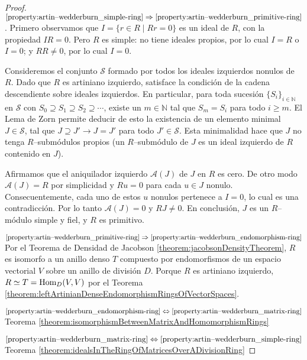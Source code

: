 \documentclass{report}
\newcommand{\naturalNumbers}{\mathbb{N}}
\newcommand{\Hom}{\textnormal{Hom}}
\begin{document}
  \begin{proof}
    \(\ref{property:artin--wedderburn_simple-ring} \Rightarrow \ref{property:artin--wedderburn_primitive-ring}\).
    Primero observamos que \(I = \{r \in R \mid R r = 0\}\) es un ideal de \(R\), con la propiedad \(I R = 0\).
    Pero \(R\) es simple: no tiene ideales propios, por lo cual \(I = R\) o \(I = 0\);
    y \(R R \neq 0\), por lo cual \(I = 0\).

    Consideremos el conjunto \(\mathcal{S}\) formado por todos los ideales izquierdos nonulos de \(R\).
    Dado que \(R\) es artiniano izquierdo, satisface la condición de la cadena descendiente sobre ideales izquierdos.
    En particular, para toda sucesión \(\{S_i\}_{i \in \naturalNumbers}\) en \(\mathcal{S}\) con \(S_0 \supseteq S_1 \supseteq S_2 \supseteq \cdots\), existe un \(m \in \naturalNumbers\) tal que \(S_m = S_i\) para todo \(i \geq m\).
    El Lema de Zorn permite deducir de esto la existencia de un elemento minimal \(J \in \mathcal{S}\), tal que \(J \supseteq J' \rightarrow J = J'\) para todo \(J' \in \mathcal{S}\).
    Esta minimalidad hace que \(J\) no tenga \(R\)--submódulos propios (un \(R\)--submódulo de \(J\) es un ideal izquierdo de \(R\) contenido en \(J\)).

    Afirmamos que el aniquilador izquierdo \(\mathcal{A}(J)\) de \(J\) en \(R\) es cero.
    De otro modo \(\mathcal{A}(J) = R\) por simplicidad y \(R u = 0\) para cada \(u \in J\) nonulo.
    Consecuentemente, cada uno de estos \(u\) nonulos pertenece a \(I = 0\), lo cual es una contradicción.
    Por lo tanto \(\mathcal{A}(J) = 0\) y \(R J \neq 0\).
    En conclusión, \(J\) es un \(R\)--módulo simple y fiel, y \(R\) es primitivo.

    \(\ref{property:artin--wedderburn_primitive-ring} \Rightarrow \ref{property:artin--wedderburn_endomorphism-ring}\)
    Por el Teorema de Densidad de Jacobson \ref{theorem:jacobsonDensityTheorem}, \(R\) es isomorfo a un anillo denso \(T\) compuesto por endomorfismos de un espacio vectorial \(V\) sobre un anillo de división \(D\).
    Porque \(R\) es artiniano izquierdo, \(R \simeq T = \Hom _D(V, V)\) por el Teorema \ref{theorem:leftArtinianDenseEndomorphismRingsOfVectorSpaces}.

    \(\ref{property:artin--wedderburn_endomorphism-ring} \Leftrightarrow \ref{property:artin--wedderburn_matrix-ring}\)
    Teorema \ref{theorem:isomorphismBetweenMatrixAndHomomorphismRings}

    \(\ref{property:artin--wedderburn_matrix-ring} \Leftrightarrow \ref{property:artin--wedderburn_simple-ring}\)
    Teorema \ref{theorem:idealsInTheRingOfMatricesOverADivisionRing}
  \end{proof}
\end{document}
